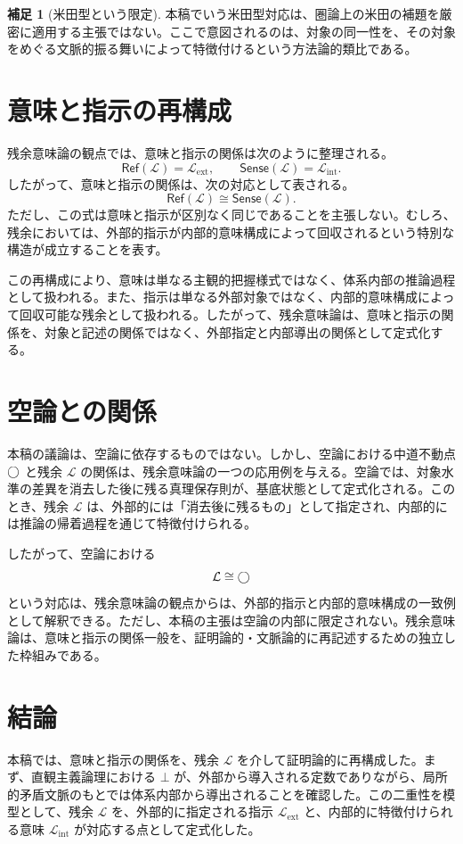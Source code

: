 \documentclass[11pt,a4paper]{article}
\newcommand{\lhagma}{\mathcal{L}}
\newcommand{\refe}{\mathsf{Ref}}
\newcommand{\sense}{\mathsf{Sense}}
\newcommand{\lext}{\lhagma_{\mathrm{ext}}}
\newcommand{\lint}{\lhagma_{\mathrm{int}}}
\theoremstyle{definition}
\newtheorem{remark}{補足}[section]
\begin{document}
\begin{remark}[米田型という限定]
本稿でいう米田型対応は、圏論上の米田の補題を厳密に適用する主張ではない。ここで意図されるのは、対象の同一性を、その対象をめぐる文脈的振る舞いによって特徴付けるという方法論的類比である。
\end{remark}

\section{意味と指示の再構成}

残余意味論の観点では、意味と指示の関係は次のように整理される。
\[
\refe(\lhagma) = \lext,
\qquad
\sense(\lhagma) = \lint .
\]
したがって、意味と指示の関係は、次の対応として表される。
\[
\refe(\lhagma) \cong \sense(\lhagma).
\]
ただし、この式は意味と指示が区別なく同じであることを主張しない。むしろ、残余においては、外部的指示が内部的意味構成によって回収されるという特別な構造が成立することを表す。

この再構成により、意味は単なる主観的把握様式ではなく、体系内部の推論過程として扱われる。また、指示は単なる外部対象ではなく、内部的意味構成によって回収可能な残余として扱われる。したがって、残余意味論は、意味と指示の関係を、対象と記述の関係ではなく、外部指定と内部導出の関係として定式化する。

\section{空論との関係}

本稿の議論は、空論に依存するものではない。しかし、空論における中道不動点 $\bigcirc$ と残余 $\lhagma$ の関係は、残余意味論の一つの応用例を与える。空論では、対象水準の差異を消去した後に残る真理保存則が、基底状態として定式化される。このとき、残余 $\lhagma$ は、外部的には「消去後に残るもの」として指定され、内部的には推論の帰着過程を通じて特徴付けられる。

したがって、空論における
\[
\lhagma \cong \dfix
\]
という対応は、残余意味論の観点からは、外部的指示と内部的意味構成の一致例として解釈できる。ただし、本稿の主張は空論の内部に限定されない。残余意味論は、意味と指示の関係一般を、証明論的・文脈論的に再記述するための独立した枠組みである。

\section{結論}

本稿では、意味と指示の関係を、残余 $\lhagma$ を介して証明論的に再構成した。まず、直観主義論理における $\bot$ が、外部から導入される定数でありながら、局所的矛盾文脈のもとでは体系内部から導出されることを確認した。この二重性を模型として、残余 $\lhagma$ を、外部的に指定される指示 $\lext$ と、内部的に特徴付けられる意味 $\lint$ が対応する点として定式化した。
\end{document}
